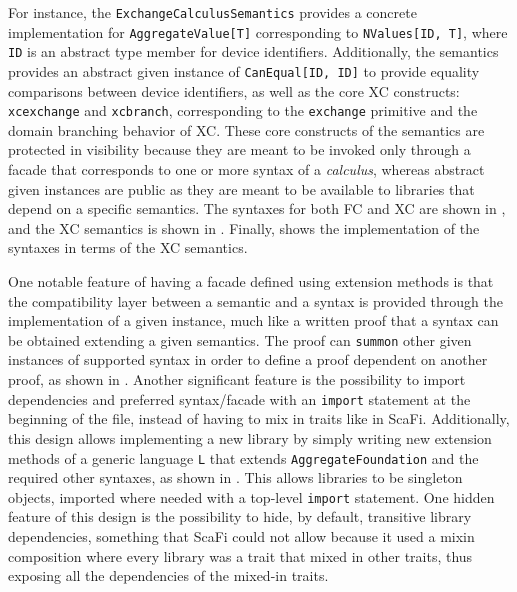 For instance, the \texttt{ExchangeCalculusSemantics} provides a concrete implementation for \texttt{AggregateValue[T]} corresponding to \texttt{NValues[ID, T]}, where \texttt{ID} is an abstract type member for device identifiers.
%
Additionally, the semantics provides an abstract given instance of \texttt{CanEqual[ID, ID]} to provide equality comparisons between device identifiers, as well as the core \ac{XC} constructs: \texttt{xcexchange} and \texttt{xcbranch}, corresponding to the \texttt{exchange} primitive and the domain branching behavior of \ac{XC}.
%
These core constructs of the semantics are protected in visibility because they are meant to be invoked only through a facade that corresponds to one or more syntax of a \textit{calculus}, whereas abstract given instances are public as they are meant to be available to libraries that depend on a specific semantics.
%
The syntaxes for both \ac{FC} and \ac{XC} are shown in , and the \ac{XC} semantics is shown in .
%
Finally,  shows the implementation of the syntaxes in terms of the \ac{XC} semantics.

One notable feature of having a facade defined using extension methods is that the compatibility layer between a semantic and a syntax is provided through the implementation of a given instance, much like a written proof that a syntax can be obtained extending a given semantics.
%
The proof can \texttt{summon} other given instances of supported syntax in order to define a proof dependent on another proof, as shown in .
%
Another significant feature is the possibility to import dependencies and preferred syntax/facade with an \texttt{import} statement at the beginning of the file, instead of having to mix in traits like in ScaFi.
%
Additionally, this design allows implementing a new library by simply writing new extension methods of a generic language \texttt{L} that extends \texttt{AggregateFoundation} and the required other syntaxes, as shown in .
%
This allows libraries to be singleton objects, imported where needed with a top-level \texttt{import} statement.
%
One hidden feature of this design is the possibility to hide, by default, transitive library dependencies, something that ScaFi could not allow because it used a mixin composition where every library was a trait that mixed in other traits, thus exposing all the dependencies of the mixed-in traits.

